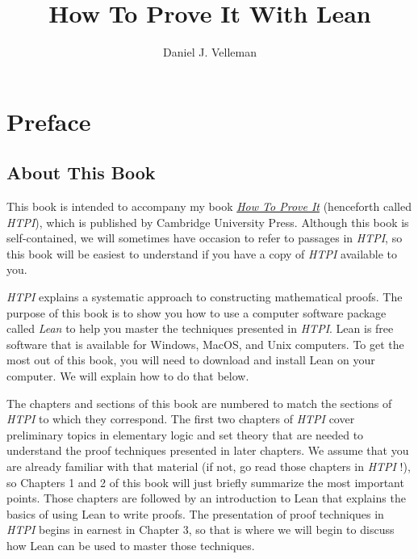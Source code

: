 \documentclass[
  letterpaper,
  DIV=11,
  numbers=noendperiod]{scrreprt}
\title{How To Prove It With Lean}
\author{Daniel J. Velleman}
\date{}
\renewcommand*\contentsname{Table of contents}
\newcommand\contentsname{Table of contents}
\begin{document}
\maketitle
\ifdefined\Shaded\renewenvironment{Shaded}{\begin{tcolorbox}[sharp corners, boxrule=0pt, breakable, interior hidden, enhanced, borderline west={3pt}{0pt}{shadecolor}, frame hidden]}{\end{tcolorbox}}\fi

\renewcommand*\contentsname{Table of contents}
{
\hypersetup{linkcolor=}
\setcounter{tocdepth}{1}
\tableofcontents
}

\hypertarget{preface}{%
\chapter*{Preface}\label{preface}}

\hypertarget{about-this-book}{%
\section*{About This Book}\label{about-this-book}}

This book is intended to accompany my book
\href{https://www.cambridge.org/highereducation/books/how-to-prove-it/6D2965D625C6836CD4A785A2C843B3DA\#overview}{\emph{How
To Prove It}} (henceforth called \emph{HTPI}), which is published by
Cambridge University Press. Although this book is self-contained, we
will sometimes have occasion to refer to passages in \emph{HTPI}, so
this book will be easiest to understand if you have a copy of
\emph{HTPI} available to you.

\emph{HTPI} explains a systematic approach to constructing mathematical
proofs. The purpose of this book is to show you how to use a computer
software package called \emph{Lean} to help you master the techniques
presented in \emph{HTPI}. Lean is free software that is available for
Windows, MacOS, and Unix computers. To get the most out of this book,
you will need to download and install Lean on your computer. We will
explain how to do that below.

The chapters and sections of this book are numbered to match the
sections of \emph{HTPI} to which they correspond. The first two chapters
of \emph{HTPI} cover preliminary topics in elementary logic and set
theory that are needed to understand the proof techniques presented in
later chapters. We assume that you are already familiar with that
material (if not, go read those chapters in \emph{HTPI} !), so Chapters
1 and 2 of this book will just briefly summarize the most important
points. Those chapters are followed by an introduction to Lean that
explains the basics of using Lean to write proofs. The presentation of
proof techniques in \emph{HTPI} begins in earnest in Chapter 3, so that
is where we will begin to discuss how Lean can be used to master those
techniques.
\end{document}
